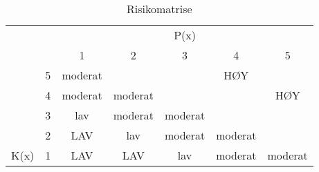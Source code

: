 \documentclass{artikel1}
\begin{document}
\begin{table}[H]
\centering
\caption{Risikomatrise}
\label{Risikomatrise}
\begin{tabular}{cl|ccccc}
\cline{3-7}
\multicolumn{1}{l}{\cellcolor[HTML]{000000}} & \multicolumn{1}{c|}{\cellcolor[HTML]{000000}} & \multicolumn{5}{c|}{P(x)}                                                                                                                                                                  \\ \cline{3-7}
\multicolumn{1}{l}{\cellcolor[HTML]{000000}} & \cellcolor[HTML]{000000}                      & \multicolumn{1}{c|}{1}          & \multicolumn{1}{c|}{2}          & \multicolumn{1}{c|}{3}          & \multicolumn{1}{c|}{4}          & \multicolumn{1}{c|}{5}                             \\ \hline
\multicolumn{1}{|c|}{}                       & 5                                             & \cellcolor[HTML]{FFC702}moderat & \cellcolor[HTML]{F8A102}        & \cellcolor[HTML]{FD6864}        & \cellcolor[HTML]{FE0000}HØY     & \cellcolor[HTML]{CB0000}{\color[HTML]{000000} HØY} \\ \cline{2-2}
\multicolumn{1}{|c|}{}                       & 4                                             & \cellcolor[HTML]{F8FF00}moderat & \cellcolor[HTML]{FFC702}moderat & \cellcolor[HTML]{F8A102}        & \cellcolor[HTML]{FD6864}        & \cellcolor[HTML]{FE0000}HØY                        \\ \cline{2-2}
\multicolumn{1}{|c|}{}                       & 3                                             & \cellcolor[HTML]{34FF34}lav     & \cellcolor[HTML]{F8FF00}moderat & \cellcolor[HTML]{FFC702}moderat & \cellcolor[HTML]{F8A102}        & \cellcolor[HTML]{FD6864}                           \\ \cline{2-2}
\multicolumn{1}{|c|}{}                       & 2                                             & \cellcolor[HTML]{32CB00}LAV     & \cellcolor[HTML]{34FF34}lav     & \cellcolor[HTML]{F8FF00}moderat & \cellcolor[HTML]{FFC702}moderat & \cellcolor[HTML]{FFCC67}                           \\ \cline{2-2}
\multicolumn{1}{|c|}{\multirow{-5}{*}{K(x)}} & 1                                             & \cellcolor[HTML]{32CB00}LAV     & \cellcolor[HTML]{32CB00}LAV     & \cellcolor[HTML]{34FF34}lav     & \cellcolor[HTML]{F8FF00}moderat & \cellcolor[HTML]{FFC702}moderat                    \\ \cline{1-2}
\end{tabular}
\end{table}
\end{document}
